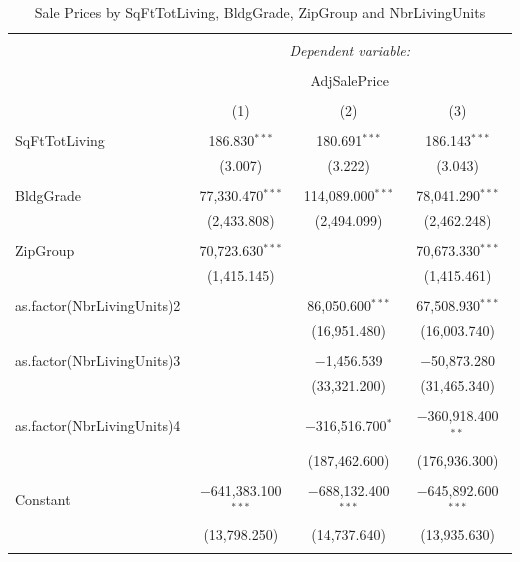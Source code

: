 \documentclass[12pt,a4paper]{article}
\begin{document}
\begin{table}[H] \centering 
	\caption{Sale Prices by SqFtTotLiving, BldgGrade, ZipGroup and NbrLivingUnits} 
	\label{}
	\begin{adjustbox}{width=1\textwidth}
	\begin{tabular}{@{\extracolsep{5pt}}lccc} 
		\\[-1.8ex]\hline 
		\hline \\[-1.8ex] 
		& \multicolumn{3}{c}{\textit{Dependent variable:}} \\ 
		\cline{2-4} 
		\\[-1.8ex] & \multicolumn{3}{c}{AdjSalePrice} \\ 
		\\[-1.8ex] & (1) & (2) & (3)\\ 
		\hline \\[-1.8ex] 
		SqFtTotLiving & 186.830$^{***}$ & 180.691$^{***}$ & 186.143$^{***}$ \\ 
		& (3.007) & (3.222) & (3.043) \\ 
		& & & \\ 
		BldgGrade & 77,330.470$^{***}$ & 114,089.000$^{***}$ & 78,041.290$^{***}$ \\ 
		& (2,433.808) & (2,494.099) & (2,462.248) \\ 
		& & & \\ 
		ZipGroup & 70,723.630$^{***}$ &  & 70,673.330$^{***}$ \\ 
		& (1,415.145) &  & (1,415.461) \\ 
		& & & \\ 
		as.factor(NbrLivingUnits)2 &  & 86,050.600$^{***}$ & 67,508.930$^{***}$ \\ 
		&  & (16,951.480) & (16,003.740) \\ 
		& & & \\ 
		as.factor(NbrLivingUnits)3 &  & $-$1,456.539 & $-$50,873.280 \\ 
		&  & (33,321.200) & (31,465.340) \\ 
		& & & \\ 
		as.factor(NbrLivingUnits)4 &  & $-$316,516.700$^{*}$ & $-$360,918.400$^{**}$ \\ 
		&  & (187,462.600) & (176,936.300) \\ 
		& & & \\ 
		Constant & $-$641,383.100$^{***}$ & $-$688,132.400$^{***}$ & $-$645,892.600$^{***}$ \\ 
		& (13,798.250) & (14,737.640) & (13,935.630) \\ 
		& & & \\ 

\end{tabular}
\end{adjustbox}
\end{table}
\end{document}
